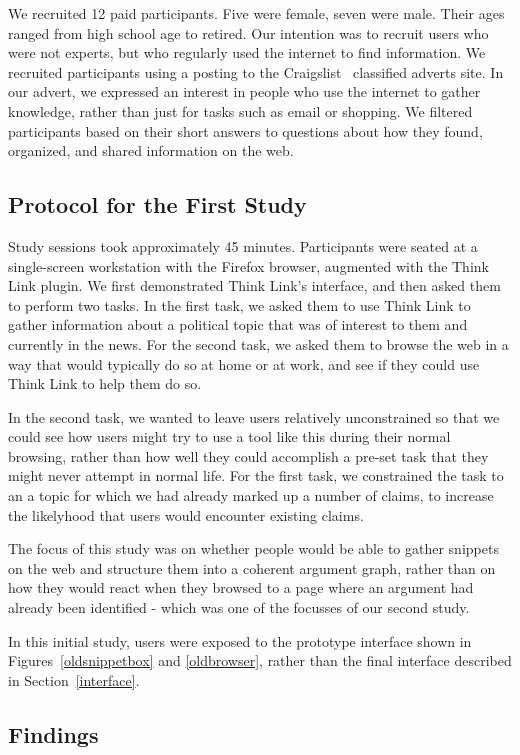 \documentclass{chi2009}
\begin{document}
We recruited 12 paid participants. Five were female, seven were male. Their ages ranged from high school age to retired. Our intention was to recruit users who were not experts, but who regularly used the internet to find information. We recruited participants using a posting to the Craigslist~\cite{craigslist} classified adverts site. In our advert, we expressed an interest in people who use the internet to gather knowledge, rather than just for tasks such as email or shopping. We filtered participants based on their short answers to questions about how they found, organized, and shared information on the web. 

\subsection{Protocol for the First Study}

Study sessions took approximately 45 minutes. Participants were seated at a single-screen workstation with the Firefox browser, augmented with the Think Link plugin. We first demonstrated Think Link's interface, and then asked them to perform two tasks. In the first task, we asked them to use Think Link to gather information about a political topic that was of interest to them and currently in the news. For the second task, we asked them to browse the web in a way that would typically do so at home or at work, and see if they could use Think Link to help them do so.

In the second task, we wanted to leave users relatively unconstrained so that we could see how users might try to use a tool like this during their normal browsing, rather than how well they could accomplish a pre-set task that they might never attempt in normal life. For the first task, we constrained the task to an a topic for which we had already marked up a number of claims, to increase the likelyhood that users would encounter existing claims.

The focus of this study was on whether people would be able to gather snippets on the web and structure them into a coherent argument graph, rather than on how they would react when they browsed to a page where an argument had already been identified - which was one of the focusses of our second study.

In this initial study, users were exposed to the prototype interface shown in Figures~\ref{oldsnippetbox} and \ref{oldbrowser}, rather than the final interface described in Section~\ref{interface}.

\subsection{Findings}
\end{document}
